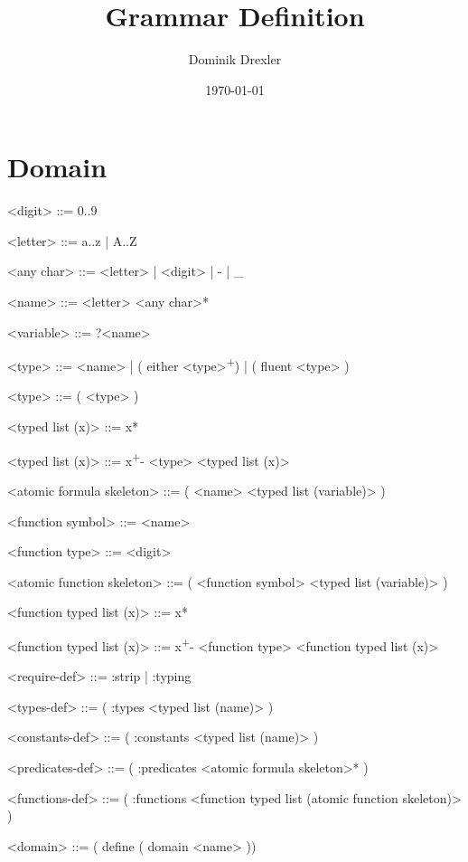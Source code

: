 \documentclass[]{article}
\title{Grammar Definition}
\author{Dominik Drexler}
\date{\today}
\begin{document}
\maketitle

\section{Domain}

\begin{grammar}
    \newcommand{\plus}{\textsuperscript{+}}
    \newcommand{\typing}{\textsuperscript{:typing~}}
    \newcommand{\fluents}{\textsuperscript{:fluents~}}

    <digit> ::= 0..9

    <letter> ::= a..z | A..Z

    <any char> ::= <letter> | <digit> | - | _

    <name> ::= <letter> <any char>*

    <variable> ::= ?<name>



    <type> ::= <name> | ( either <type>\plus ) | ( fluent <type> )

    <type> ::= ( <type> )

    <typed list (x)> ::= x*

    <typed list (x)> ::= x\plus - <type> <typed list (x)>


    <atomic formula skeleton> ::= ( <name> <typed list (variable)> )



    <function symbol> ::= <name>

    <function type> ::= <digit>

    <atomic function skeleton> ::= ( <function symbol> <typed list (variable)> )

    <function typed list (x)> ::= x*

    <function typed list (x)> ::= x\plus - <function type> <function typed list (x)>



    <require-def> ::= :strip | :typing

    <types-def> ::= ( :types <typed list (name)> )

    <constants-def> ::= ( :constants <typed list (name)> )

    <predicates-def> ::= ( :predicates <atomic formula skeleton>* )

    <functions-def> ::= ( :functions <function typed list (atomic function skeleton)> )

    <domain> ::= ( define ( domain <name> )    )

\end{grammar}

\nocite{mcdermott-et-al-1998}



\end{document}
